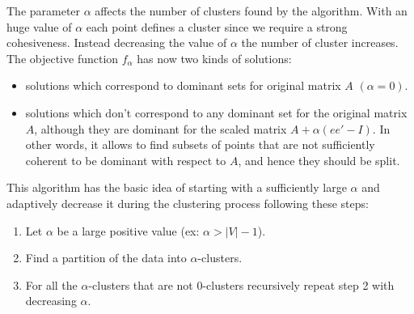 The parameter $\alpha$ affects the number of clusters found by the algorithm. With an huge value of $\alpha$ each point defines a cluster since we require a strong cohesiveness. Instead decreasing the value of $\alpha$ the number of cluster increases.\\
The objective function $f_{\alpha}$ has now two kinds of solutions:
\begin{itemize}
	\item solutions which correspond to dominant sets for original matrix $A$ $(\alpha=0)$.
	
	\item solutions which don't correspond to any dominant set for the original matrix $A$, although they are dominant for the scaled matrix $A+\alpha(ee' - I)$. In other words, it allows to find subsets of points that are not sufficiently coherent to be dominant with respect to $A$, and hence they should be split.	
\end{itemize}
This algorithm has the basic idea of starting with a sufficiently large $\alpha$ and adaptively decrease it during the clustering process following these steps:
\begin{enumerate}
	\item Let $\alpha$ be a large positive value (ex: $\alpha > |V|-1$).
	\item Find a partition of the data into $\alpha$-clusters.
	\item For all the $\alpha$-clusters that are not 0-clusters recursively repeat step 2 with decreasing $\alpha$.
\end{enumerate}
\newpage
